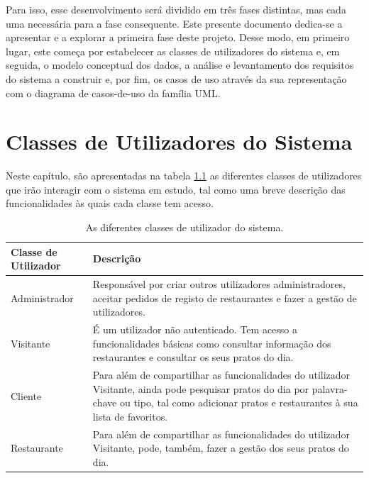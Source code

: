 \documentclass[a4paper,12pt]{report}
\begin{document}
	Para isso, esse desenvolvimento será dividido em três fases distintas, mas cada uma necessária para a fase consequente. Este presente documento dedica-se a apresentar e a explorar a primeira fase deste projeto. Desse modo, em primeiro lugar,  este começa por estabelecer as classes de utilizadores do sistema e, em seguida, o modelo conceptual dos dados, a análise e levantamento dos requisitos do sistema a construir e, por fim, os casos de uso através da sua representação com o diagrama de casos-de-uso da família UML.
	
	
\chapter{Classes de Utilizadores do Sistema}	

	Neste capítulo, são apresentadas na tabela \ref{tab:classesUtilizadores} as diferentes classes de utilizadores que irão interagir com o sistema em estudo, tal como uma breve descrição das funcionalidades às quais cada classe tem acesso.
	
	\begin{table}[H]
	\begin{tabularx}{\textwidth}{|l|X|}
	\hline
	Classe de Utilizador & Descrição\\ 
	\hline
 	\hline
 	Administrador & Responsável por criar outros utilizadores administradores, aceitar pedidos de registo de restaurantes e fazer a gestão de utilizadores.\\
 	\hline 
	Visitante & É um utilizador não autenticado. Tem acesso a funcionalidades básicas como consultar informação dos restaurantes e consultar os seus pratos do dia.\\ 
	\hline
	Cliente & Para além de compartilhar as funcionalidades do utilizador Visitante, ainda pode pesquisar pratos do dia por palavra-chave ou tipo, tal como adicionar pratos e restaurantes à sua lista de favoritos.\\
	\hline
	Restaurante & Para além de compartilhar as funcionalidades do utilizador Visitante, pode, também, fazer a gestão dos seus pratos do dia.\\
	\hline
	\end{tabularx}
	\caption{As diferentes classes de utilizador do sistema.}
	\label{tab:classesUtilizadores}
	\end{table}	
	
	
	
	


\end{document}
